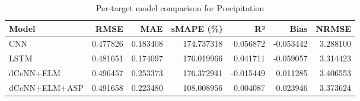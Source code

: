 \begin{table}
\caption{Per-target model comparison for Precipitation}
\begin{tabular}{lrrrrrr}
\toprule
Model & RMSE & MAE & sMAPE (\%) & R² & Bias & NRMSE \\
\midrule
CNN & 0.477826 & 0.183408 & 174.737318 & 0.056872 & -0.053442 & 3.288100 \\
LSTM & 0.481651 & 0.174097 & 176.019966 & 0.041711 & -0.059057 & 3.314423 \\
dCeNN+ELM & 0.496457 & 0.253373 & 176.372941 & -0.015449 & 0.011285 & 3.406553 \\
dCeNN+ELM+ASP & 0.491658 & 0.223480 & 108.008956 & 0.004087 & 0.023946 & 3.373624 \\
\bottomrule
\end{tabular}
\end{table}
